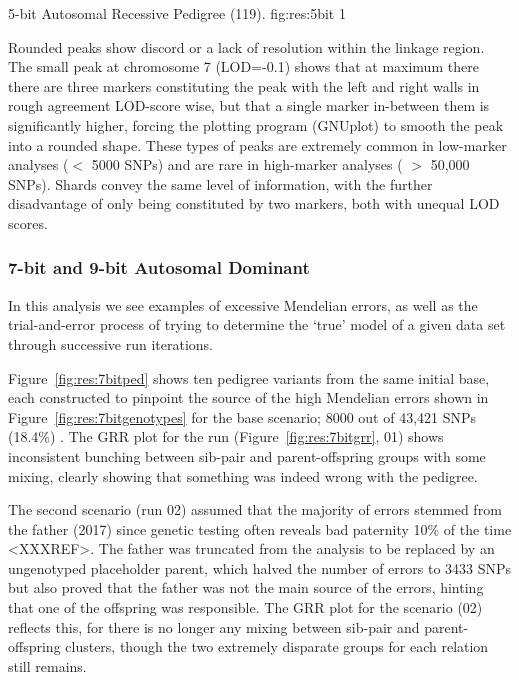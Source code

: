 {5-bit Autosomal Recessive Pedigree (119).}
{fig:res:5bit}
{1}
{}

Rounded peaks show discord or a lack of resolution within the linkage region. The small peak at chromosome 7 (LOD=-0.1) shows that at maximum there there are three markers constituting the peak with the left and right walls in rough agreement LOD-score wise, but that a single marker in-between them is significantly higher, forcing the plotting program (GNUplot) to smooth the peak into a rounded shape. These types of peaks are extremely common in low-marker analyses ($<$ 5000 SNPs) and are rare in high-marker analyses ( $>$ 50,000 SNPs). Shards convey the same level of information, with the further disadvantage of only being constituted by two markers, both with unequal LOD scores.

\subsubsection*{7-bit and 9-bit Autosomal Dominant}

In this analysis we see examples of excessive Mendelian errors, as well as the trial-and-error process of trying to determine the ‘true’ model of a given data set through successive run iterations.

Figure~\ref{fig:res:7bitped} shows ten pedigree variants from the same initial base, each constructed to pinpoint the source of the high Mendelian errors shown in Figure~\ref{fig:res:7bitgenotypes} for the base scenario; 8000 out of 43,421 SNPs (18.4\%) . The GRR plot for the run (Figure~\ref{fig:res:7bitgrr}, 01) shows inconsistent bunching between sib-pair and parent-offspring groups with some mixing, clearly showing that something was indeed wrong with the pedigree.

The second scenario (run 02) assumed that the majority of errors stemmed from the father (2017) since genetic testing often reveals bad paternity 10\% of the time <XXXREF>. The father was truncated from the analysis to be replaced by an ungenotyped placeholder parent, which halved the number of errors to 3433 SNPs but also proved that the father was not the main source of the errors, hinting that one of the offspring was responsible. The GRR plot for the scenario (02) reflects this, for there is no longer any mixing between sib-pair and parent-offspring clusters, though the two extremely disparate groups for each relation still remains.


